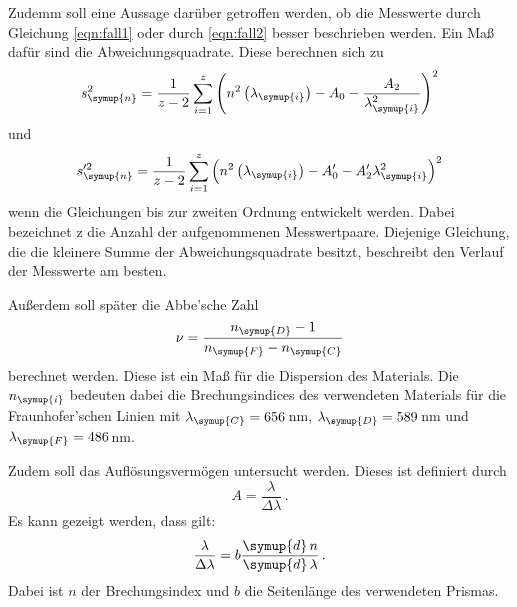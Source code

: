 Zudemm soll eine Aussage darüber getroffen werden, ob die Messwerte durch Gleichung
\eqref{eqn:fall1} oder durch \eqref{eqn:fall2} besser beschrieben werden. Ein Maß
dafür sind die Abweichungsquadrate. Diese berechnen sich zu
\begin{equation}
  s_{\symup{n}}^2=\frac{1}{z-2}\sum_{i=1}^{z}\left(n^2\left(\lambda_{\symup{i}}\right)
  -A_0-\frac{A_2}{\lambda_{\symup{i}}^2}\right)^2
  \label{eqn:abweichung1}
\end{equation}
und 
\begin{equation}
  s_{\symup{n}}'^2=\frac{1}{z-2}\sum_{i=1}^{z}\left(n^2\left(\lambda_{\symup{i}}\right)
  -A_0'-A_2'\lambda_{\symup{i}}^2\right)^2
  \label{eqn:abweichung2}
\end{equation}
wenn die Gleichungen bis zur zweiten Ordnung entwickelt werden. Dabei bezeichnet z
die Anzahl der aufgenommenen Messwertpaare. Diejenige Gleichung, die die kleinere
Summe der Abweichungsquadrate besitzt, beschreibt den Verlauf der Messwerte am besten.

Außerdem soll später die Abbe'sche Zahl
\begin{equation}
  \nu=\frac{n_{\symup{D}}-1}{n_{\symup{F}}-n_{\symup{C}}}
  \label{eqn:abbe}
\end{equation}
berechnet werden. Diese ist ein Maß für die Dispersion des Materials.
Die $n_{\symup{i}}$ bedeuten dabei die Brechungsindices des
verwendeten Materials für die Fraunhofer'schen Linien mit $\lambda_{\symup{C}}=656\,$nm,
$\lambda_{\symup{D}}=589\,$nm und $\lambda_{\symup{F}}=486\,$nm.

Zudem soll das Auflösungsvermögen untersucht werden. Dieses ist definiert durch
\begin{equation}
  A=\frac{\lambda}{\Delta\lambda} \,.
\end{equation}
Es kann gezeigt werden, dass gilt:
\begin{equation}
  \frac{\lambda}{\Delta\lambda}=b\frac{\symup{d}\,n}{\symup{d}\,\lambda} \,.
  \label{eqn:aufloesung}
\end{equation}
Dabei ist $n$ der Brechungsindex und $b$ die Seitenlänge des verwendeten Prismas.
